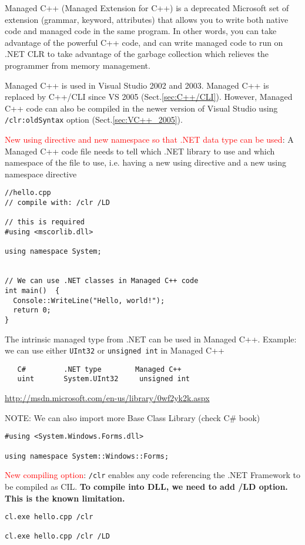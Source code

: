 Managed C++ (Managed Extension for C++) is a deprecated Microsoft set of
extension (grammar, keyword, attributes) that allows you to write both native
code and managed code in the same program.  In other words, you can take
advantage of the powerful C++ code, and can write managed code to run on .NET
CLR to take advantage of the garbage collection which relieves the programmer
from memory management.

Managed C++ is used in Visual Studio 2002 and 2003. Managed C++ is replaced by
C++/CLI since VS 2005 (Sect.\ref{sec:C++/CLI}). However, Managed C++ code can
also be compiled in the newer version of Visual Studio using
\verb!/clr:oldSyntax! option (Sect.\ref{sec:VC++_2005}).



\textcolor{red}{New using directive and new namespace so that .NET data type can
be used}: A Managed C++ code file needs to tell which .NET library to use and
which namespace of the file to use, i.e. having a new using directive and a new
using namespace directive
\begin{verbatim}
//hello.cpp
// compile with: /clr /LD

// this is required
#using <mscorlib.dll>

using namespace System;


// We can use .NET classes in Managed C++ code 
int main()  {
  Console::WriteLine("Hello, world!");
  return 0;
}
\end{verbatim}

The intrinsic managed type from .NET can be used in Managed C++. 
Example: we can use either \verb!UInt32! or \verb!unsigned int! in Managed C++
\begin{verbatim}
   C#         .NET type        Managed C++
   uint       System.UInt32     unsigned int
\end{verbatim}
\url{http://msdn.microsoft.com/en-us/library/0wf2yk2k.aspx}

NOTE: We can also import more Base Class Library (check C\# book)
\begin{verbatim}
#using <System.Windows.Forms.dll>

using namespace System::Windows::Forms;
\end{verbatim} 

\textcolor{red}{New compiling option}: \verb!/clr! enables any code referencing the .NET Framework to be compiled as CIL. {\bf To compile into DLL, we need to add /LD option. This is the known limitation.}

\begin{Verbatim}
cl.exe hello.cpp /clr

cl.exe hello.cpp /clr /LD
\end{Verbatim}



